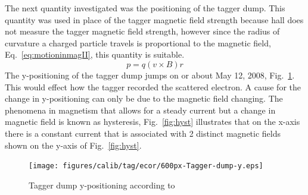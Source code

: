 The next quantity investigated was the positioning of the tagger dump. This quantity was used in place of the tagger magnetic field strength because hall  does not measure the tagger magnetic field strength, however since the radius of curvature a charged particle travels is proportional to the magnetic field, Eq.~\ref{eq:motioninmagII}, this quantity is suitable.
\begin{equation}\label{eq:motioninmagII}
    p = q(v \times B)r
\end{equation}
The y-positioning of the tagger dump jumps on or about May 12, 2008, Fig.~\ref{fig:tagdump}. This would effect how the tagger recorded the scattered electron. A cause for the change in y-positioning can only be due to the magnetic field changing. The phenomena in magnetism that allows for a steady current but a change in magnetic field is known as hysteresis, Fig.~\ref{fig:hyst} illustrates that on the x-axis there is a constant current that is associated with 2 distinct magnetic fields shown on the y-axis of Fig.~\ref{fig:hyst}.   
\begin{figure}\begin{center}
\texttt{[image: figures/calib/tag/ecor/600px-Tagger-dump-y.eps]}
\caption[Tagger Dump Y-Positioning]{\label{fig:tagdump}Tagger dump y-positioning according to }
\end{center}\end{figure}

